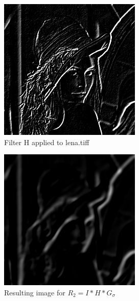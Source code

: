 \documentclass{article}
\begin{document}
\begin{figure}[H]
	\begin{center}
		\includegraphics[width=\textwidth]{./images/imH.png}
		\caption{Filter H applied to lena.tiff}
    \label{lenaH}
	\end{center}
\end{figure}

\begin{figure}[H]
	\begin{center}
		\includegraphics[width=\textwidth]{./images/imR2.png}
		\caption{Resulting image for $R_2 = I * H * G_{\sigma}$} 
    \label{lenaR2}
	\end{center}
\end{figure}
\end{document}
